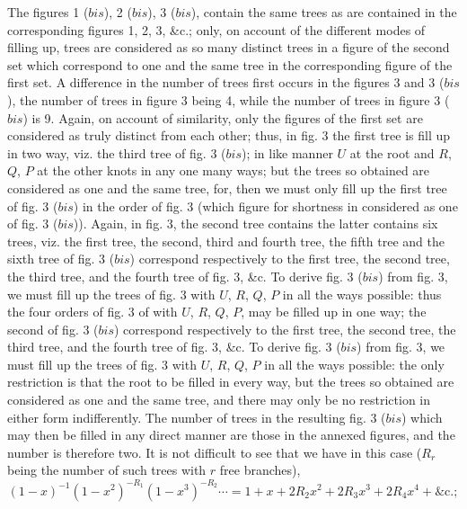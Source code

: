\documentclass[12pt,a4paper]{article}
\theoremstyle{definition}
\begin{document}
The figures 1 ($bis$), 2 ($bis$), 3 ($bis$), contain the same trees as are contained in the
corresponding figures 1, 2, 3, \&c.; only, on account of the different modes of filling up,
trees are considered as so many distinct trees in a figure of the second set which
correspond to one and the same tree in the corresponding figure of the first set. A
difference in the number of trees first occurs in the figures 3 and 3 ($bis$), the
number of trees in figure 3 being 4, while the number of trees in figure 3 ($bis$) is 9.
Again, on account of similarity, only the figures of the first set are considered as truly
distinct from each other; thus, in fig. 3 the first tree is fill up in two way, viz.
the third tree of fig. 3 ($bis$); in like manner $U$ at the root and $R$, $Q$, $P$ at the other
knots in any one many ways; but the trees so obtained are considered as one and the same
tree, for, then we must only fill up the first tree of fig. 3 ($bis$) in the order of fig. 3
(which figure for shortness in considered as one of fig. 3 ($bis$)). Again, in fig. 3, the
second tree contains the latter contains six trees, viz. the first tree,
the second, third and fourth tree, the fifth tree and the sixth tree of fig. 3 ($bis$)
correspond respectively to the first tree, the second tree, the third tree, and the fourth
tree of fig. 3, \&c. To derive fig. 3 ($bis$) from fig. 3, we must fill up the trees of fig.
3 with $U$, $R$, $Q$, $P$ in all the ways possible: thus the four orders of fig. 3 of
with $U$, $R$, $Q$, $P$, may be filled up in one way; the second of fig. 3 ($bis$)
correspond respectively to the first tree, the second tree, the third tree, and the fourth
tree of fig. 3, \&c. To derive fig. 3 ($bis$) from fig. 3, we must fill up the trees of fig.
3 with $U$, $R$, $Q$, $P$ in all the ways possible: the only restriction is that the root
to be filled in every way, but the trees so obtained are considered as one and the same
tree, and there may only be no restriction in either form indifferently. The number of trees in
the resulting fig. 3 ($bis$) which may then be filled in any direct manner are those in
the annexed figures, and the number is therefore two. It is not difficult to
see that we have in this case ($R_r$ being the number of such trees with $r$ free branches),
\[
(1 - x)^{-1}(1 - x^2)^{-R_1}(1 - x^3)^{-R_2}\cdots = 1 + x + 2R_2 x^2 + 2R_3 x^3 + 2R_4 x^4 + \&\textrm{c.};
\]

\medskip
\end{document}
